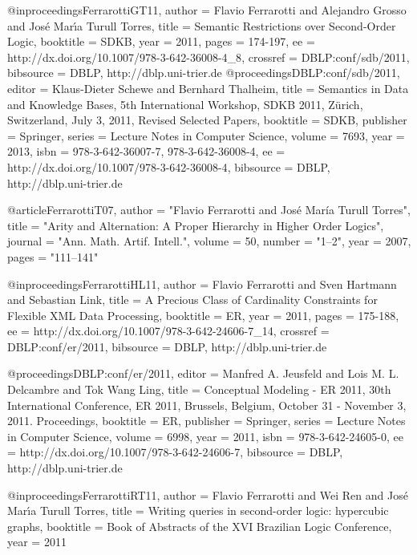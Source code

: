 \documentclass{article}
\begin{document}
@inproceedings{FerrarottiGT11,
  author    = {Flavio Ferrarotti and
               Alejandro Grosso and
               Jos\'e Mar\'{\i}a {Turull Torres}},
  title     = {Semantic Restrictions over Second-Order Logic},
  booktitle = {SDKB},
  year      = {2011},
  pages     = {174-197},
  ee        = {http://dx.doi.org/10.1007/978-3-642-36008-4_8},
  crossref  = {DBLP:conf/sdb/2011},
  bibsource = {DBLP, http://dblp.uni-trier.de}
}
@proceedings{DBLP:conf/sdb/2011,
  editor    = {Klaus-Dieter Schewe and
               Bernhard Thalheim},
  title     = {Semantics in Data and Knowledge Bases, 5th International
               Workshop, SDKB 2011, Z{\"u}rich, Switzerland, July 3, 2011,
               Revised Selected Papers},
  booktitle = {SDKB},
  publisher = {Springer},
  series    = {Lecture Notes in Computer Science},
  volume    = {7693},
  year      = {2013},
  isbn      = {978-3-642-36007-7, 978-3-642-36008-4},
  ee        = {http://dx.doi.org/10.1007/978-3-642-36008-4},
  bibsource = {DBLP, http://dblp.uni-trier.de}
}


@article{FerrarottiT07,
  author    = "Flavio Ferrarotti and Jos{\'e} Mar{\'i}a {Turull Torres}",
  title     = "Arity and Alternation: A Proper Hierarchy in Higher Order Logics",
  journal   = "Ann. Math. Artif. Intell.",
  volume    = 50,
  number    = "1--2",
  year      = 2007,
  pages     = "111--141"
}

@inproceedings{FerrarottiHL11,
  author    = {Flavio Ferrarotti and
               Sven Hartmann and
               Sebastian Link},
  title     = {A Precious Class of Cardinality Constraints for Flexible
               {XML} Data Processing},
  booktitle = {ER},
  year      = {2011},
  pages     = {175-188},
  ee        = {http://dx.doi.org/10.1007/978-3-642-24606-7_14},
  crossref  = {DBLP:conf/er/2011},
  bibsource = {DBLP, http://dblp.uni-trier.de}
}

@proceedings{DBLP:conf/er/2011,
  editor    = {Manfred A. Jeusfeld and
               Lois M. L. Delcambre and
               Tok Wang Ling},
  title     = {Conceptual Modeling - ER 2011, 30th International Conference,
               ER 2011, Brussels, Belgium, October 31 - November 3, 2011.
               Proceedings},
  booktitle = {ER},
  publisher = {Springer},
  series    = {Lecture Notes in Computer Science},
  volume    = {6998},
  year      = {2011},
  isbn      = {978-3-642-24605-0},
  ee        = {http://dx.doi.org/10.1007/978-3-642-24606-7},
  bibsource = {DBLP, http://dblp.uni-trier.de}
}


@inproceedings{FerrarottiRT11,
  author    = {Flavio Ferrarotti and Wei Ren and Jos\'e Mar\'{\i}a {Turull Torres}},
  title     = {Writing queries in second-order logic: hypercubic graphs},
  booktitle = {Book of Abstracts of the XVI Brazilian Logic Conference},
  year      = {2011}
}
\end{document}
